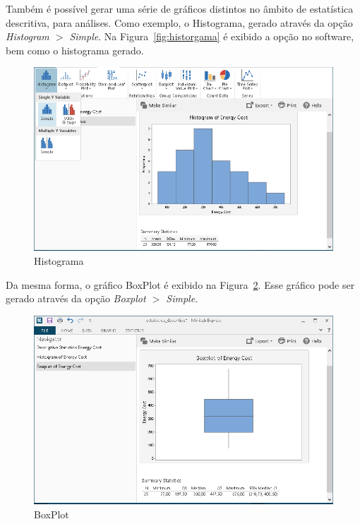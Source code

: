 \documentclass{article}
\begin{document}
Também é possível gerar uma série de gráficos distintos no âmbito de estatística descritiva, para análises. Como exemplo, o Histograma, gerado através da opção \textit{Histogram $>$ Simple}. Na Figura~\ref{fig:historgama} é exibido a opção no software, bem como o histograma gerado.

\begin{figure}[!h]
    \centering
    \includegraphics[scale=0.75]{histograma.png}
    \caption{Histograma}
    \label{fig:histograma}
\end{figure}

Da mesma forma, o gráfico BoxPlot é exibido na Figura~\ref{fig:boxplot}. Esse gráfico pode ser gerado através da opção \textit{Boxplot $>$ Simple}.

\begin{figure}[!h]
    \centering
    \includegraphics[scale=0.75]{boxplot.png}
    \caption{BoxPlot}
    \label{fig:boxplot}
\end{figure}
\end{document}
